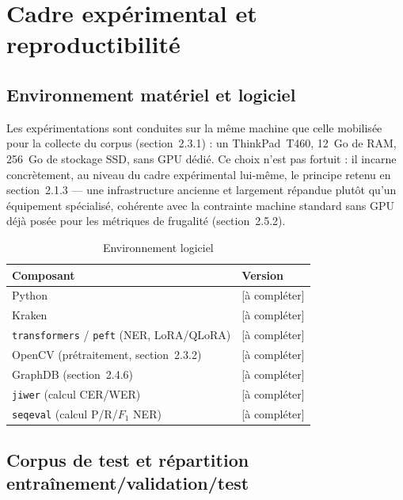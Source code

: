 \section{Cadre expérimental et reproductibilité}

\subsection{Environnement matériel et logiciel}

Les expérimentations sont conduites sur la même machine que celle mobilisée pour
la collecte du corpus (section~2.3.1) : un ThinkPad~T460, 12~Go de RAM, 256~Go de
stockage SSD, sans GPU dédié. Ce choix n'est pas fortuit : il incarne concrètement,
au niveau du cadre expérimental lui-même, le principe retenu en section~2.1.3 ---
une infrastructure ancienne et largement répandue plutôt qu'un équipement
spécialisé, cohérente avec la contrainte \og machine standard sans GPU \fg{} déjà
posée pour les métriques de frugalité (section~2.5.2).

\begin{table}[H]
    \centering
    \small
    \caption{Environnement logiciel}
    \label{tab:environnement-logiciel}
    \begin{tabular}{ll}
        \toprule
        \textbf{Composant}                                      & \textbf{Version} \\
        \midrule
        Python                                                  & [à compléter]    \\
        Kraken                                                  & [à compléter]    \\
        \texttt{transformers} / \texttt{peft} (NER, LoRA/QLoRA) & [à compléter]    \\
        OpenCV (prétraitement, section~2.3.2)                   & [à compléter]    \\
        GraphDB (section~2.4.6)                                 & [à compléter]    \\
        \texttt{jiwer} (calcul CER/WER)                         & [à compléter]    \\
        \texttt{seqeval} (calcul P/R/$F_1$ NER)                 & [à compléter]    \\
        \bottomrule
    \end{tabular}
\end{table}

\subsection{Corpus de test et répartition entraînement/validation/test}

